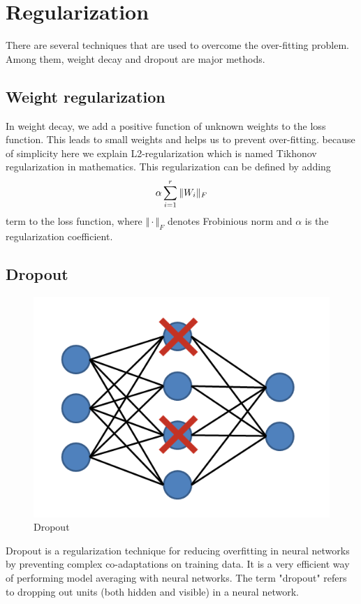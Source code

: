 \documentclass[10pt]{SelfArx} %
\begin{document}
	\section{Regularization}
		There are several techniques that are used to overcome the over-fitting problem. Among them, weight decay and dropout are major methods. 
	\subsection{Weight regularization}
In weight decay, we add a positive function of unknown weights to the loss function. This leads to small weights and helps us to prevent over-fitting. because of simplicity here we explain L2-regularization which is named Tikhonov regularization in mathematics.
	This regularization can be defined by adding 
	\begin{equation}
	\centering
	\alpha \sum_{i=1}^r \Vert W_i \Vert_F
	\end{equation}
	term to the loss function, where $\Vert \cdot \Vert_F$ denotes Frobinious norm and $\alpha$ is the regularization coefficient.
	\subsection{Dropout}
		\begin{figure}\centering 
		\includegraphics[width=\linewidth]{img/dropout}
		\caption{Dropout}
	\end{figure}
	Dropout is a regularization technique for reducing overfitting in neural networks by preventing complex co-adaptations on training data. It is a very efficient way of performing model averaging with neural networks. The term "dropout" refers to dropping out units (both hidden and visible) in a neural network.
\end{document}
